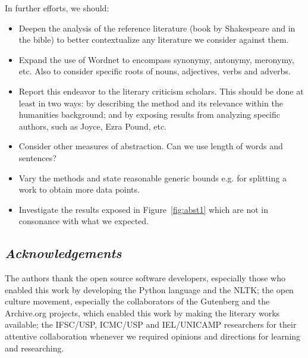 \documentclass[12pt,fleqn]{article}
\begin{document}
In further efforts, we should:
\begin{itemize}
    \item Deepen the analysis of the reference literature (book by Shakespeare and in the bible)
        to better contextualize any literature we consider against them.
    \item Expand the use of Wordnet to encompass synonymy, antonymy, meronymy, etc.
        Also to consider specific roots of nouns, adjectives, verbs and adverbs.
    \item Report this endeavor to the literary criticism scholars.
        This should be done at least in two ways: by describing the method and its relevance
        within the humanities background;
        and by exposing results from analyzing specific authors, such as Joyce, Ezra Pound, etc.
    \item Consider other measures of abstraction.
        Can we use length of words and sentences?
    \item Vary the methods and state reasonable generic bounds e.g. for splitting a work to
        obtain more data points.
    \item Investigate the results exposed in Figure~\ref{fig:abst1} which are not in consonance with what we expected.
\end{itemize}

\subsection*{\textit{Acknowledgements}}
The authors thank the open source software developers,
especially those who enabled this work by developing
the Python language and the NLTK;
the open culture movement, especially the collaborators
of the Gutenberg and the Archive.org projects, which
enabled this work by making the literary works available;
the IFSC/USP, ICMC/USP and IEL/UNICAMP researchers for their attentive
collaboration whenever we required opinions and directions for learning and researching.
\end{document}
